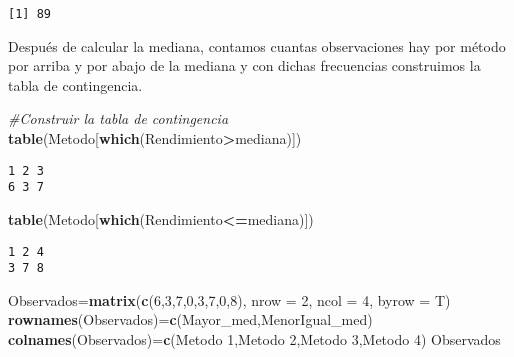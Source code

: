 \documentclass[
  a4paper,
  oneside,
  openany]{book}
\newenvironment{Shaded}{\begin{snugshade}}{\end{snugshade}}
\newcommand{\CommentTok}[1]{\textcolor[rgb]{0.56,0.35,0.01}{\textit{#1}}}
\newcommand{\DataTypeTok}[1]{\textcolor[rgb]{0.13,0.29,0.53}{#1}}
\newcommand{\DecValTok}[1]{\textcolor[rgb]{0.00,0.00,0.81}{#1}}
\newcommand{\KeywordTok}[1]{\textcolor[rgb]{0.13,0.29,0.53}{\textbf{#1}}}
\newcommand{\NormalTok}[1]{#1}
\newcommand{\OperatorTok}[1]{\textcolor[rgb]{0.81,0.36,0.00}{\textbf{#1}}}
\newcommand{\StringTok}[1]{\textcolor[rgb]{0.31,0.60,0.02}{#1}}
\begin{document}
\begin{verbatim}
[1] 89
\end{verbatim}

Después de calcular la mediana, contamos cuantas observaciones hay por método por arriba y por abajo de la mediana y con dichas frecuencias construimos la tabla de contingencia.

\begin{Shaded}
\begin{Highlighting}[]
\CommentTok{\#Construir la tabla de contingencia}
\KeywordTok{table}\NormalTok{(Metodo[}\KeywordTok{which}\NormalTok{(Rendimiento}\OperatorTok{\textgreater{}}\NormalTok{mediana)])}
\end{Highlighting}
\end{Shaded}

\begin{verbatim}
1 2 3 
6 3 7 
\end{verbatim}

\begin{Shaded}
\begin{Highlighting}[]
\KeywordTok{table}\NormalTok{(Metodo[}\KeywordTok{which}\NormalTok{(Rendimiento}\OperatorTok{\textless{}=}\NormalTok{mediana)])}
\end{Highlighting}
\end{Shaded}

\begin{verbatim}
1 2 4 
3 7 8 
\end{verbatim}

\begin{Shaded}
\begin{Highlighting}[]
\NormalTok{Observados=}\KeywordTok{matrix}\NormalTok{(}\KeywordTok{c}\NormalTok{(}\DecValTok{6}\NormalTok{,}\DecValTok{3}\NormalTok{,}\DecValTok{7}\NormalTok{,}\DecValTok{0}\NormalTok{,}\DecValTok{3}\NormalTok{,}\DecValTok{7}\NormalTok{,}\DecValTok{0}\NormalTok{,}\DecValTok{8}\NormalTok{), }\DataTypeTok{nrow =} \DecValTok{2}\NormalTok{, }\DataTypeTok{ncol =} \DecValTok{4}\NormalTok{, }\DataTypeTok{byrow =}\NormalTok{ T)}
\KeywordTok{rownames}\NormalTok{(Observados)=}\KeywordTok{c}\NormalTok{(}\StringTok{\textquotesingle{}Mayor\_med\textquotesingle{}}\NormalTok{,}\StringTok{\textquotesingle{}MenorIgual\_med\textquotesingle{}}\NormalTok{)}
\KeywordTok{colnames}\NormalTok{(Observados)=}\KeywordTok{c}\NormalTok{(}\StringTok{\textquotesingle{}Metodo 1\textquotesingle{}}\NormalTok{,}\StringTok{\textquotesingle{}Metodo 2\textquotesingle{}}\NormalTok{,}\StringTok{\textquotesingle{}Metodo 3\textquotesingle{}}\NormalTok{,}\StringTok{\textquotesingle{}Metodo 4\textquotesingle{}}\NormalTok{)}
\NormalTok{Observados}
\end{Highlighting}
\end{Shaded}
\end{document}
